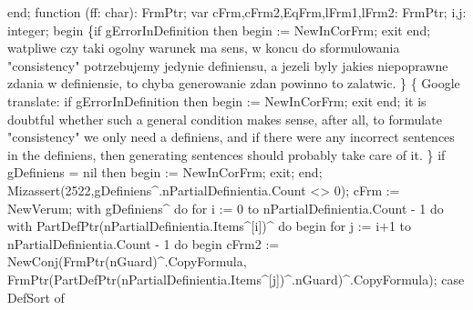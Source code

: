end;
\eatline
{}\nwendcode{}\nwdocspar
\nwenddocs{}\endmoddef\nwstartdeflinemarkup{}\nwenddeflinemarkup
function (ff: char): FrmPtr;
var
   cFrm,cFrm2,EqFrm,lFrm1,lFrm2: FrmPtr;
   i,j: integer;
begin
   \{if gErrorInDefinition then begin  := NewInCorFrm; exit end;
    watpliwe czy taki ogolny warunek ma sens, w koncu do sformulowania
    "consistency" potrzebujemy jedynie definiensu, a jezeli byly jakies
    niepoprawne zdania w definiensie, to chyba generowanie zdan powinno to
    zalatwic.
   \}
   \{ Google translate:
    if gErrorInDefinition then begin  := NewInCorFrm; exit end;
    it is doubtful whether such a general condition makes sense, after all, to formulate
    "consistency" we only need a definiens, and if there were any
    incorrect sentences in the definiens, then generating sentences should probably
    take care of it. \}
   if gDefiniens = nil then
   begin
       := NewInCorFrm; exit;
   end;
   Mizassert(2522,gDefiniens^.nPartialDefinientia.Count <> 0);
   cFrm := NewVerum;
   with gDefiniens^ do
      for i := 0 to nPartialDefinientia.Count - 1 do
         with PartDefPtr(nPartialDefinientia.Items^[i])^ do
      begin
         for j :=  i+1 to nPartialDefinientia.Count - 1 do
         begin
            cFrm2 := NewConj(FrmPtr(nGuard)^.CopyFormula,
                             FrmPtr(PartDefPtr(nPartialDefinientia.Items^[j])^.nGuard)^.CopyFormula);
            case DefSort of
